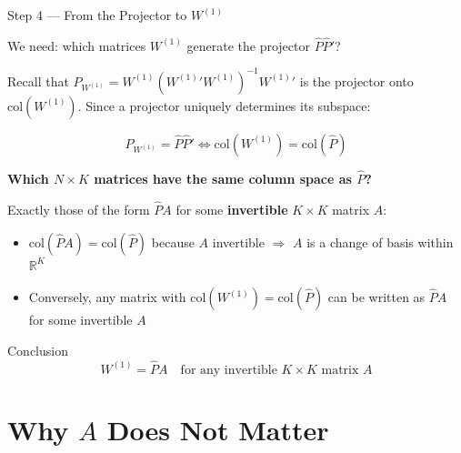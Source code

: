 \documentclass[aspectratio=169, 10pt]{beamer}
\newcommand{\Phat}{\hat{P}}
\newcommand{\Wone}{W^{(1)}}
\newcommand{\Pw}{P_{W^{(1)}}}
\begin{document}
\begin{frame}{Step 4 — From the Projector to $\Wone$}

We need: which matrices $\Wone$ generate the projector $\Phat\Phat'$?

\medskip
Recall that $\Pw = \Wone(\Wone{}'\Wone)^{-1}\Wone{}'$ is the projector onto
$\mathrm{col}(\Wone)$. Since a projector uniquely determines its subspace:

$$\Pw = \Phat\Phat' \iff \mathrm{col}(\Wone) = \mathrm{col}(\Phat)$$

\medskip
\textbf{Which $N\times K$ matrices have the same column space as $\Phat$?}

Exactly those of the form $\Phat A$ for some \textbf{invertible} $K\times K$ matrix $A$:
\begin{itemize}
  \item $\mathrm{col}(\Phat A) = \mathrm{col}(\Phat)$ because $A$ invertible $\Rightarrow$
        $A$ is a change of basis within $\mathbb{R}^K$
  \item Conversely, any matrix with $\mathrm{col}(\Wone) = \mathrm{col}(\Phat)$ can be
        written as $\Phat A$ for some invertible $A$
\end{itemize}

\bigskip
\begin{alertblock}{Conclusion}
$$\boxed{\Wone = \Phat A \quad \text{for any invertible } K\times K \text{ matrix } A}$$
\end{alertblock}

\end{frame}

\section{Why $A$ Does Not Matter}
\end{document}
